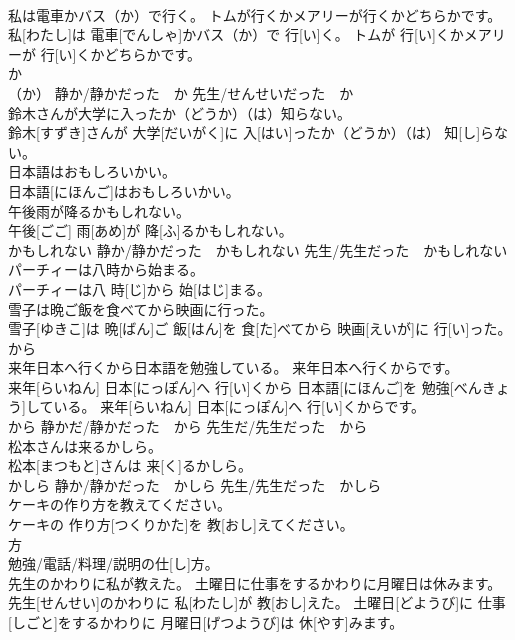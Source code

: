 \documentclass[8pt]{extreport}
\begin{document}
\begin{CJK}{UTF8}{min}
\\	私は電車かバス（か）で行く。 トムが行くかメアリーが行くかどちらかです。	
\\	私[わたし]は 電車[でんしゃ]かバス（か）で 行[い]く。 トムが 行[い]くかメアリーが 行[い]くかどちらかです。	
\\	か　
\\	（か） 静か/静かだった　か 先生/せんせいだった　か	
\\	鈴木さんが大学に入ったか（どうか）（は）知らない。	
\\	鈴木[すずき]さんが 大学[だいがく]に 入[はい]ったか（どうか）（は） 知[し]らない。	
\\	日本語はおもしろいかい。	
\\	日本語[にほんご]はおもしろいかい。	
\\	午後雨が降るかもしれない。	
\\	午後[ごご] 雨[あめ]が 降[ふ]るかもしれない。	
\\	かもしれない 静か/静かだった　かもしれない 先生/先生だった　かもしれない	
\\	パーチィーは八時から始まる。	
\\	パーチィーは八 時[じ]から 始[はじ]まる。	
\\	雪子は晩ご飯を食べてから映画に行った。	
\\	雪子[ゆきこ]は 晩[ばん]ご 飯[はん]を 食[た]べてから 映画[えいが]に 行[い]った。	
\\	から	
\\	来年日本へ行くから日本語を勉強している。 来年日本へ行くからです。	
\\	来年[らいねん] 日本[にっぽん]へ 行[い]くから 日本語[にほんご]を 勉強[べんきょう]している。 来年[らいねん] 日本[にっぽん]へ 行[い]くからです。	
\\	から 静かだ/静かだった　から 先生だ/先生だった　から	
\\	松本さんは来るかしら。	
\\	松本[まつもと]さんは 来[く]るかしら。	
\\	かしら 静か/静かだった　かしら 先生/先生だった　かしら	
\\	ケーキの作り方を教えてください。	
\\	ケーキの 作り方[つくりかた]を 教[おし]えてください。	
\\	方	
\\	勉強/電話/料理/説明の仕[し]方。
\\	先生のかわりに私が教えた。 土曜日に仕事をするかわりに月曜日は休みます。	
\\	先生[せんせい]のかわりに 私[わたし]が 教[おし]えた。 土曜日[どようび]に 仕事[しごと]をするかわりに 月曜日[げつようび]は 休[やす]みます。	

\end{CJK}
\end{document}
